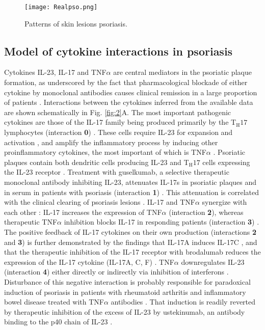 \begin{figure}[ht]
	\centering
	\texttt{[image: Realpso.png]}
	\caption[Patterns of skin lesions psoriasis]{Patterns of skin lesions psoriasis.}
	\label{fig:1}
\end{figure}

\subsection{Model of cytokine interactions in psoriasis}
Cytokines IL-23, IL-17 and TNF$\alpha$ are central mediators in the psoriatic plaque formation, as underscored by the fact that pharmacological blockade of either cytokine by monoclonal antibodies causes clinical remission in a large proportion of patients \citep{jabbar2017}. Interactions between the cytokines inferred from the available data are shown schematically in Fig. \ref{fig:2}A. The most important pathogenic cytokines are those of the IL-17 family being produced primarily by the T$_{\text{H}}17$ lymphocytes (interaction \textbf{0}) \citep{krueger2012}. These cells require IL-23 for expansion and activation \citep{cosmi2008, wilson2007, zheng2007}, and amplify the inflammatory process by inducing other proinflammatory cytokines, the most important of which is TNF$\alpha$ \citep{boehncke2015}. Psoriatic plaques contain both dendritic cells producing IL-23 and T$_{\text{H}}17$ cells expressing the IL-23 receptor \citep{cosmi2008, lee2004, tillack2014, wilson2007}. Treatment with guselkumab, a selective therapeutic monoclonal antibody inhibiting IL-23, attenuates IL-17s in psoriatic plaques and in serum in patients with psoriasis (interaction \textbf{1}) \citep{hawkes2018,sofen2014,tillack2014}. This attenuation is correlated with the clinical clearing of psoriasis lesions \citep{sofen2014}. IL-17 and TNF$\alpha$ synergize with each other \citep{alzabin2012, krueger2012, xu2017}: IL-17 increases the expression of TNF$\alpha$ \citep{jovanovic1998} (interaction \textbf{2}), whereas therapeutic TNF$\alpha$ inhibition blocks IL-17 in responding patients (interaction \textbf{3}) \citep{zaba2007, zaba2009}. The positive feedback of IL-17 cytokines on their own production (interactions \textbf{2} and \textbf{3}) is further demonstrated by the findings that IL-17A induces IL-17C \citep{xu2018}, and that the therapeutic inhibition of the IL-17 receptor with brodalumab reduces the expression of the IL-17 cytokine (IL-17A, C, F) \citep{russell2014}. TNF$\alpha$ downregulates IL-23 (interaction \textbf{4}) either directly \citep{notley2008, zakharova2005} or indirectly via inhibition of interferons \citep{palucka2005, tillack2014}. Disturbance of this negative interaction is probably responsible for paradoxical induction of psoriasis in patients with rheumatoid arthritis and inflammatory bowel disease treated with TNF$\alpha$ antibodies \citep{palucka2005, tillack2014}. That induction is readily reverted by therapeutic inhibition of the excess of IL-23 by ustekinumab, an antibody binding to the p40 chain of IL-23 \citep{tillack2014}. 

